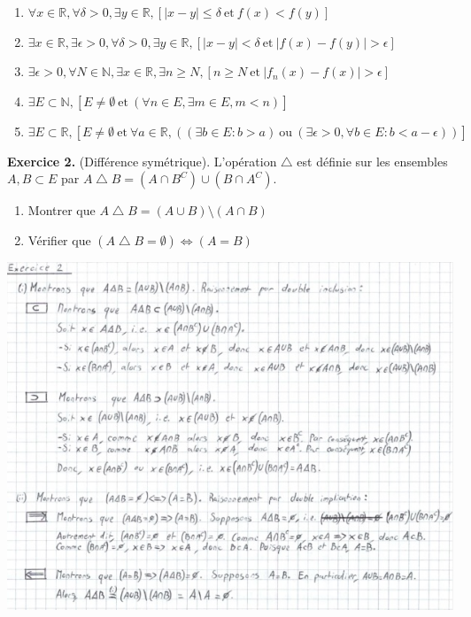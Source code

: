 \documentclass[a4paper, 10pt]{report}
\providecommand{\abs}[1]{\lvert#1\rvert}
\begin{document}
	\colorbox{solution}
	{
		\begin{minipage}{0.9\textwidth}
			\begin{enumerate}[label=(\roman*)]
				\item $\forall x \in \mathbb{R},
				\forall \delta > 0,
				\exists y \in \mathbb{R},
				[\abs{x - y} \leq \delta \ \text{et}\ f(x) < f(y)]$
				\item $\exists x \in \mathbb{R},
				\exists \epsilon > 0,
				\forall \delta > 0,
				\exists y \in \mathbb{R},
				[\abs{x - y} < \delta \ \text{et}\ \abs{f(x) - f(y)} > \epsilon]$
				\item $\exists \epsilon > 0,
				\forall N \in \mathbb{N},
				\exists x \in \mathbb{R},
				\exists n \geq N,
				[n \geq N \ \text{et}\ \abs{f_n(x) - f(x)} > \epsilon]$
				\item $\exists E \subset \mathbb{N},
				[E \neq \emptyset \ \text{et}\ (\forall n \in E,
				\exists m \in E, m < n)]$
				\item $\exists E \subset \mathbb{R},
				[E \neq \emptyset \ \text{et}\ \forall a \in \mathbb{R},
				((\exists b \in E : b > a)\
				\text{ou}\
				(\exists \epsilon > 0,
				\forall b \in E : b < a - \epsilon))]$
			\end{enumerate}
		\end{minipage}
	}
	
	\vspace{5mm}
	\fancyhf{}
	\renewcommand{\headrule}
	{\rule{\textwidth}{0pt}}
	
	\noindent
	\textbf{Exercice 2.} (Différence symétrique). L'opération
	$\bigtriangleup$ est définie sur les ensembles $A, B \subset E$
	par $A \bigtriangleup B = (A \cap B^C) \cup (B \cap A^C)$.
	
	\begin{enumerate}[label=(\roman*)]
		\item Montrer que $A \bigtriangleup B =
			(A \cup B) \setminus (A \cap B)$
		\item Vérifier que $(A \bigtriangleup B = \emptyset)
			\iff (A = B)$
	\end{enumerate}
	
	\includegraphics{ex02.jpg}
	
\end{document}
